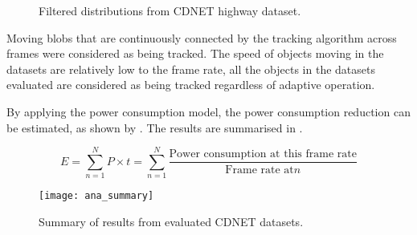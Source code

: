 \begin{figure}[htb]
  \centering
  \caption{Filtered distributions from CDNET highway dataset.}
  \label{ana:ada}
\end{figure}

Moving blobs that are continuously connected by the tracking algorithm across frames were considered as being tracked. The speed of objects moving in the datasets are relatively low to the frame rate, all the objects in the datasets evaluated are considered as being tracked regardless of adaptive operation.

By applying the power consumption model, the power consumption reduction can be estimated, as shown by . The results are summarised in .

\begin{equation}
	E = \sum_{n=1}^{N} P \times t = \sum_{n=1}^{N} \frac{\text{Power consumption at this frame rate}}{\text{Frame rate at} n}
	\label{ana:eq:power}
\end{equation}

\begin{figure}[htb]
  \centering
  \texttt{[image: ana\_summary]}
  \caption{Summary of results from evaluated CDNET datasets.}
  \label{ana:summary}
\end{figure}
